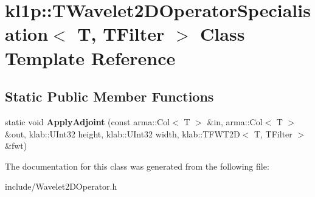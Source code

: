 \hypertarget{classkl1p_1_1TWavelet2DOperatorSpecialisation}{}\section{kl1p\+:\+:T\+Wavelet2\+D\+Operator\+Specialisation$<$ T, T\+Filter $>$ Class Template Reference}
\label{classkl1p_1_1TWavelet2DOperatorSpecialisation}
\subsection*{Static Public Member Functions}
\begin{DoxyCompactItemize}
\item 
static void {\bfseries Apply\+Adjoint} (const arma\+::\+Col$<$ T $>$ \&in, arma\+::\+Col$<$ T $>$ \&out, klab\+::\+U\+Int32 height, klab\+::\+U\+Int32 width, klab\+::\+T\+F\+W\+T2D$<$ T, T\+Filter $>$ \&fwt)\hypertarget{classkl1p_1_1TWavelet2DOperatorSpecialisation_a3c56265b68c3757f7f311927b7c26851}{}\label{classkl1p_1_1TWavelet2DOperatorSpecialisation_a3c56265b68c3757f7f311927b7c26851}

\end{DoxyCompactItemize}


The documentation for this class was generated from the following file\+:\begin{DoxyCompactItemize}
\item 
include/Wavelet2\+D\+Operator.\+h\end{DoxyCompactItemize}
